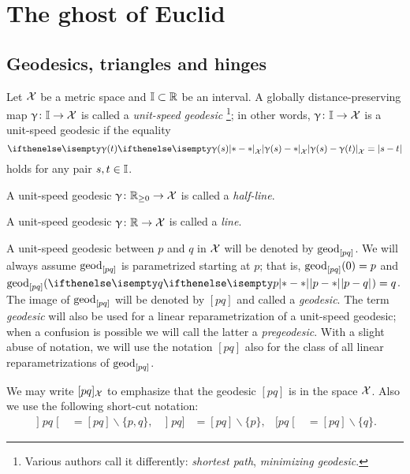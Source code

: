 \chapter{The ghost of Euclid
}

\section{Geodesics, triangles and hinges}
\label{sec:geods}

Let $\mathcal{X}$ be a metric space 
and $\II\subset \R$\index{$\II$} be an interval. 
A globally distance-preserving map $\gamma\:\II\to \spc{X}$ is called a \emph{unit-speed geodesic}%
\footnote{Various authors call it differently: \emph{shortest path}, \emph{minimizing geodesic}.}; 
in other words, $\gamma\:\II\to \spc{X}$ is a unit-speed geodesic if the equality
\[\dist{\gamma(s)}{\gamma(t)}{\spc{X}}=|s-t|\]
holds for any pair $s,t\in \II$.

A unit-speed geodesic $\gamma\:\RR_{\ge0}\to \spc{X}$ is called a \emph{half-line}. %

A unit-speed geodesic  $\gamma\:\RR\to \spc{X}$ is called a \emph{line}.

A unit-speed geodesic between $p$ and $q$ in $\mathcal{X}$ will be denoted by $\mathrm{geod}_{[p q]}$\index{$\geod_{[{*}{*}]}$}.
We will always assume $\mathrm{geod}_{[p q]}$ is parametrized starting at $p$; 
that is, $\mathrm{geod}_{[p q]}(0)=p$ and $\geod_{[p q]}(\dist{p}{q}{})=q$.
The image of $\mathrm{geod}_{[p q]}$ will be denoted by $[p q]$\index{$[{*}{*}]$} and called a \emph{geodesic}.
The term \emph{geodesic} will also be used for  a linear reparametrization of a unit-speed geodesic;
when a confusion is possible we will call the latter a \emph{pregeodesic}.
With a slight abuse of notation, we will use the notation $[p q]$ also for the class of all linear reparametrizations of $\mathrm{geod}_{[p q]}$.

We may write $[p q]_{\mathcal{X}}$ 
to emphasize that the geodesic $[p q]$ is in the space  ${\mathcal{X}}$.
Also we use the following short-cut notation:
\begin{align*}
\mathopen{]} p q \mathclose{[}&=[pq]\backslash\{p,q\},
&
\mathopen{]} p q ]&=[pq]\backslash\{p\},
&
[ p q \mathclose{[}&=[pq]\backslash\{q\}.
\end{align*}


